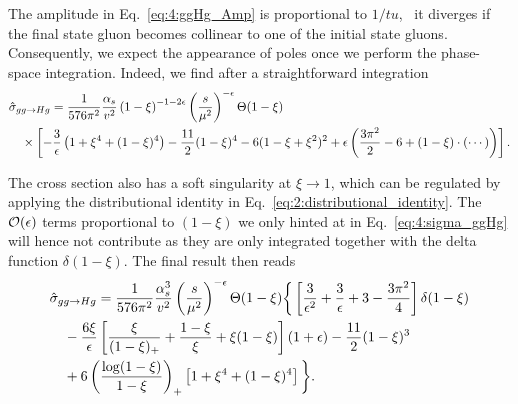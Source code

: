 The amplitude in Eq.~\eqref{eq:4:ggHg_Amp} is proportional to $1/tu$, \ie\ it diverges if the final state gluon becomes collinear to one of the initial state gluons. Consequently, we expect the appearance of poles once we perform the phase-space integration. Indeed, we find after a straightforward integration
\begin{equation}
\begin{split}
& \hat{\sigma}_{gg \rightarrow H g} = \frac{1}{576 \pi^2} \frac{\alpha_s}{v^2} \left(1 - \xi \right)^{-1 - 2 \epsilon} \left( \frac{s}{\mu^2} \right)^{-\epsilon} \Theta (1 - \xi) \\
& \quad \times \left[ - \frac{3}{\epsilon} \left(1 + \xi^4 + (1 - \xi)^4 \right) - \frac{11}{2} (1 - \xi)^4 - 6 (1 - \xi + \xi^2)^2 + \epsilon \left( \frac{3 \pi^2}{2} - 6 + (1 - \xi)\cdot \left(\cdots \right) \right) \right].
\label{eq:4:sigma_ggHg}
\end{split}
\end{equation}

The cross section also has a soft singularity at $\xi \rightarrow 1$, which can be regulated by applying the distributional identity in Eq.~\eqref{eq:2:distributional_identity}. The $\mathcal{O}\!\left(\epsilon\right)$ terms proportional to $(1 - \xi)$ we only hinted at in Eq.~\eqref{eq:4:sigma_ggHg} will hence not contribute as they are only integrated together with the delta function $\delta (1 - \xi)$. The final result then reads
\begin{equation}
\begin{split}
& \hat{\sigma}_{gg \rightarrow H g} = \frac{1}{576 \pi^2} \frac{\alpha_s^3}{v^2} \left(\frac{s}{\mu^2} \right)^{-\epsilon} \Theta (1 - \xi) \bigg \lbrace \left[ \frac{3}{\epsilon^2} + \frac{3}{\epsilon} + 3 - \frac{3 \pi^2}{4} \right] \delta(1 - \xi) \\
&\quad - \frac{6 \xi}{\epsilon} \left[ \frac{\xi}{(1 - \xi)_+} + \frac{1 - \xi}{\xi} + \xi (1 - \xi) \right] (1 + \epsilon) - \frac{11}{2} (1 - \xi)^3 \\
& \quad + 6 \left(\frac{\log (1 - \xi)}{1 - \xi} \right)_+ \left[1 + \xi^4 + (1 - \xi)^4 \right]  \bigg \rbrace.
\end{split}
\label{eq:4:sigma_ggHg_full}
\end{equation}

